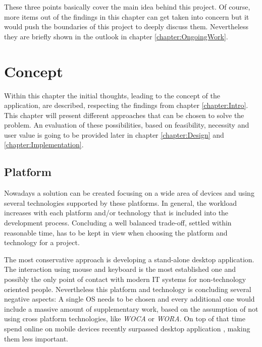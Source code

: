 These three points basically cover the main idea behind this project. Of course, more items out of the findings in this chapter can get taken into concern but it would push the boundaries of this project to deeply discuss them. Nevertheless they are briefly shown in the outlook in chapter \vref{chapter:OngoingWork}.

\chapter{Concept}
\label{chapter:Concept}
Within this chapter the initial thoughts, leading to the concept of the application, are described, respecting the findings from chapter \ref{chapter:Intro}. This chapter will present different approaches that can be chosen to solve the problem. An evaluation of these possibilities, based on feasibility, necessity and user value is going to be provided later in chapter \vref{chapter:Design} and \vref{chapter:Implementation}.

\section{Platform}
\label{sec:Platform}

Nowadays a solution can be created focusing on a wide area of devices and using several technologies supported by these platforms. In general, the workload increases with each platform and/or technology that is included into the development process. Concluding a well balanced trade-off, settled within reasonable time, has to be kept in view when choosing the platform and technology for a project.

The most conservative approach is developing a stand-alone desktop application. The interaction using mouse and keyboard is the most established one and possibly the only point of contact with modern \gls{IT} systems for non-technology oriented people. Nevertheless this platform and technology is concluding several negative aspects: A single \gls{OS} needs to be chosen and every additional one would include a massive amount of supplementary work, based on the assumption of not using cross platform technologies, like \emph{\Acrfull{WOCA}} or \emph{\Acrfull{WORA}}. On top of that time spend online on mobile devices recently surpassed desktop application \cite{Murtagh:2014aa}, making them less important. 

